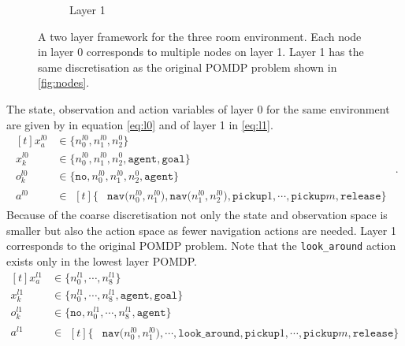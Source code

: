 \begin{figure}
\begin{subfigure}[b]{0.48\textwidth}
        \caption{Layer 1}
        \label{subfig:l1}
    \end{subfigure}
    \caption{A two layer framework for the three room environment. Each node in layer 0 corresponds to multiple nodes on layer 1. Layer 1 has the same discretisation as the original POMDP problem shown in \ref{fig:nodes}.}
    \label{fig:two_layers}
\end{figure}
The state, observation and action variables of layer 0 for the same environment are given by in equation \ref{eq:l0} and of layer 1 in \ref{eq:l1}. 
%
\begin{equation}\label{eq:l0}
    \begin{aligned}[t] 
        x_a^{l0} &\in \big\{n_0^{l0}, n_1^{l0}, n_2^{0}  \big\} \\
        x_k^{l0} &\in  \big\{n_0^{l0}, n_1^{l0}, n_2^{0}, \texttt{agent},\texttt{goal}  \big\}\\
        o_k^{l0} &\in \big\{\texttt{no}, n_0^{l0}, n_1^{l0}, n_2^{0}, \texttt{agent} \big\}\\
        a^{l0} &\in \begin{aligned}[t]\big\{&\texttt{nav($n_0^{l0}, n_1^{l0}$)}, \texttt{nav($n_1^{l0}, n_2^{l0}$)},\texttt{pickup}1, \cdots, \texttt{pickup}m, \texttt{release}\big\}
        \end{aligned}
    \end{aligned}.
\end{equation}
%
Because of the coarse discretisation not only the state and observation space is smaller but also the action space as fewer navigation actions are needed. Layer 1 corresponds to the original POMDP problem. Note that the \texttt{look\_around} action exists only in the lowest layer POMDP. 
%
\begin{equation}\label{eq:l1}
    \begin{aligned}[t] 
        x_a^{l1} &\in \big\{n_0^{l1}, \cdots, n_8^{l1} \big\} \\
        x_k^{l1} &\in  \big\{n_0^{l1},\cdots, n_8^{l1}, \texttt{agent},\texttt{goal}  \big\}\\
        o_k^{l1} &\in \big\{\texttt{no}, n_0^{l1},\cdots, n_8^{l1}, \texttt{agent} \big\}\\
        a^{l1} &\in \begin{aligned}[t]\big\{&\texttt{nav($n_0^{l0}, n_1^{l0}$)}, \cdots,\texttt{look\_around}, \texttt{pickup}1, \cdots, \texttt{pickup}m, \texttt{release}\big\}
        \end{aligned}
    \end{aligned}
\end{equation}
